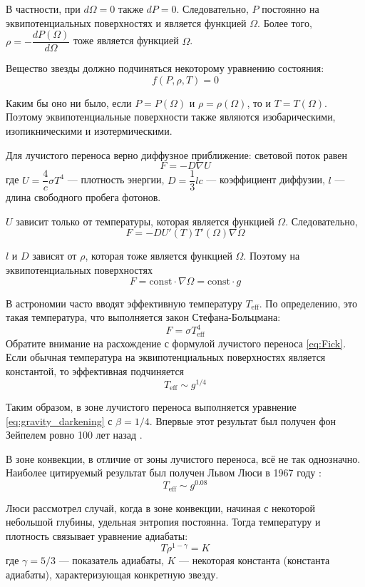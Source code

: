 В частности, при $d\Omega = 0$ также $dP = 0$. Следовательно, $P$ постоянно на эквипотенциальных поверхностях и является функцией $\Omega$. Более того, $\rho = -\dfrac{dP(\Omega)}{d\Omega}$ тоже является функцией $\Omega$.

Вещество звезды должно подчиняться некоторому уравнению состояния:
\[
f(P, \rho, T) = 0
\]

Каким бы оно ни было, если $P = P(\Omega)$ и $\rho = \rho(\Omega)$, то и $T = T(\Omega)$. Поэтому эквипотенциальные поверхности также являются изобарическими, изопикническими и изотермическими.

Для лучистого переноса верно диффузное приближение: световой поток равен
\begin{equation}
F = -D \nabla U
\label{eq:Fick}
\end{equation}
где $U = \dfrac{4}{c} \sigma T^4$ --- плотность энергии, $D = \dfrac{1}{3} l c$ --- коэффициент диффузии, $l$ --- длина свободного пробега фотонов.

$U$ зависит только от температуры, которая является функцией $\Omega$. Следовательно,
\[
F = - D U'(T) T'(\Omega) \nabla \Omega
\]

$l$ и $D$ зависят от $\rho$, которая тоже является функцией $\Omega$. Поэтому на эквипотенциальных поверхностях
\[
F = \text{const} \cdot \nabla \Omega = \text{const} \cdot g
\]

В астрономии часто вводят эффективную температуру $T_\text{eff}$. По определению, это такая температура, что выполняется закон Стефана-Больцмана: 
\[
F = \sigma T_\text{eff}^4
\]
Обратите внимание на расхождение с формулой лучистого переноса \eqref{eq:Fick}. Если обычная температура на эквипотенциальных поверхностях является константой, то эффективная подчиняется
\[
T_\text{eff} \sim g^{1/4}
\]

Таким образом, в зоне лучистого переноса выполняется уравнение \eqref{eq:gravity_darkening} с $\beta = 1/4$.
Впервые этот результат был получен фон Зейпелем ровно 100 лет назад \cite{vonZeipel}.



В зоне конвекции, в отличие от зоны лучистого переноса, всё не так однозначно. Наиболее цитируемый результат был получен Львом Люси в 1967 году \cite{Lucy}:
\[
T_\text{eff} \sim g^{0.08}
\]

Люси рассмотрел случай, когда в зоне конвекции, начиная с некоторой небольшой глубины, удельная энтропия постоянна. Тогда температуру и плотность связывает уравнение адиабаты:
\begin{equation*}
T \rho^{1 - \gamma} = K
\label{eq:adiabat}
\end{equation*}
где $\gamma = 5/3$ --- показатель адиабаты, $K$ --- некоторая константа (константа адиабаты), характеризующая конкретную звезду.

